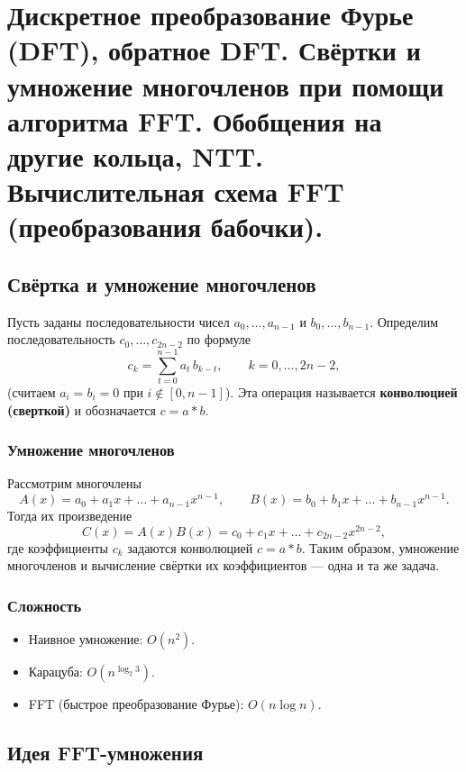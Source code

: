 
\section{Дискретное преобразование Фурье (DFT), обратное DFT. Свёртки и умножение многочленов при помощи алгоритма FFT. Обобщения на другие кольца, NTT. Вычислительная схема FFT (преобразования бабочки).}

\subsection*{Свёртка и умножение многочленов}

\begin{Definition}{}{}
	Пусть заданы последовательности чисел
	$a_0,\dots,a_{n-1}$ и $b_0,\dots,b_{n-1}$.
	Определим последовательность $c_0,\dots,c_{2n-2}$ по формуле
	\[
	c_k=\sum_{t=0}^{n-1} a_t\, b_{k-t}, \qquad k=0,\dots,2n-2,
	\]
	(считаем $a_i=b_i=0$ при $i\notin[0,n-1]$).
	Эта операция называется \textbf{конволюцией (сверткой)} и обозначается $c=a*b$.
\end{Definition}

\subsubsection*{Умножение многочленов}

Рассмотрим многочлены
\[
A(x)=a_0+a_1x+\dots+a_{n-1}x^{n-1},
\qquad
B(x)=b_0+b_1x+\dots+b_{n-1}x^{n-1}.
\]
Тогда их произведение
\[
C(x)=A(x)B(x)= c_0+c_1x+\dots+c_{2n-2}x^{2n-2},
\]
где коэффициенты $c_k$ задаются конволюцией $c=a*b$. Таким образом, умножение многочленов и вычисление свёртки их коэффициентов — одна и та же задача.

\subsubsection*{Сложность}

\begin{itemize}
	\item Наивное умножение: $O(n^2)$.
	\item Карацуба: $O\!\left(n^{\log_2 3}\right)$.
	\item FFT (быстрое преобразование Фурье): $O(n\log n)$.
\end{itemize}

\subsection*{Идея FFT-умножения}

